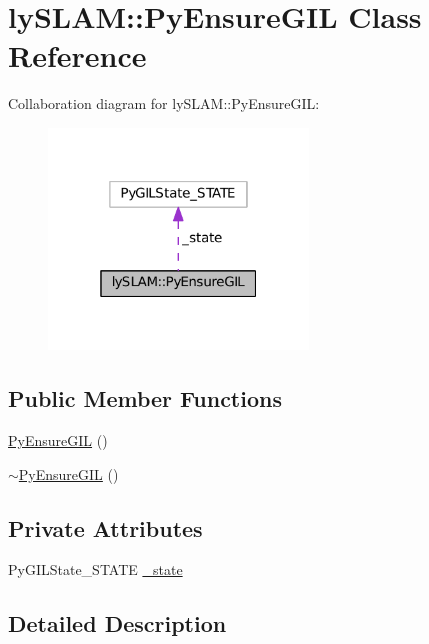 \hypertarget{classlySLAM_1_1PyEnsureGIL}{}\section{ly\+S\+L\+AM\+:\+:Py\+Ensure\+G\+IL Class Reference}
\label{classlySLAM_1_1PyEnsureGIL}


Collaboration diagram for ly\+S\+L\+AM\+:\+:Py\+Ensure\+G\+IL\+:\nopagebreak
\begin{figure}[H]
\begin{center}
\leavevmode
\includegraphics[width=196pt]{classlySLAM_1_1PyEnsureGIL__coll__graph}
\end{center}
\end{figure}
\subsection*{Public Member Functions}
\begin{DoxyCompactItemize}
\item 
\hyperlink{classlySLAM_1_1PyEnsureGIL_a1b7f914c64f03eaf053e2854925d620a}{Py\+Ensure\+G\+IL} ()
\item 
\hyperlink{classlySLAM_1_1PyEnsureGIL_a39bb4f6f02bbd598d89819ddd2b90529}{$\sim$\+Py\+Ensure\+G\+IL} ()
\end{DoxyCompactItemize}
\subsection*{Private Attributes}
\begin{DoxyCompactItemize}
\item 
Py\+G\+I\+L\+State\+\_\+\+S\+T\+A\+TE \hyperlink{classlySLAM_1_1PyEnsureGIL_ade2080afcd63201ae95bb0eb5bfd3696}{\+\_\+state}
\end{DoxyCompactItemize}


\subsection{Detailed Description}


